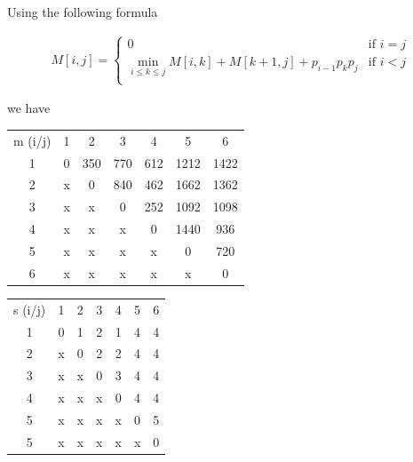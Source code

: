 \documentclass[12pt]{article}
\begin{document}
\begin{enumerate}[1.]
\begin{mdframed}
        \bigskip

        Using the following formula

        \begin{align}
            M[i,j] = \begin{cases}
                0 & \text{if $i = j$}\\
                \min_{i \leq k \leq j} M[i,k] + M[k+1,j] + p_{i-1}p_{k}p_j & \text{if $i < j$}\\
            \end{cases}
        \end{align}

        we have

        \begin{center}
            \begin{tabular}{|c|c|c|c|c|c|c|}
                \hline
                m (i/j) & 1 & 2 & 3 & 4 & 5 & 6\\
                1 & 0 & 350 & 770 & 612 & 1212 & 1422\\
                2 & x & 0 & 840 & 462 & 1662 & 1362\\
                3 & x & x & 0 & 252 & 1092 & 1098\\
                4 & x & x & x & 0 & 1440 & 936\\
                5 & x & x & x & x & 0 & 720\\
                6 & x & x & x & x & x & 0\\
                \hline
            \end{tabular}

            \color{red}
            \begin{tabular}{|c|c|c|c|c|c|c|}
                \hline
                s (i/j) & 1 & 2 & 3 & 4 & 5 & 6\\
                1 & 0 & 1 & 2 & 1 & 4 & 4\\
                2 & x & 0 & 2 & 2 & 4 & 4\\
                3 & x & x & 0 & 3 & 4 & 4\\
                4 & x & x & x & 0 & 4 & 4\\
                5 & x & x & x & x & 0 & 5\\
                5 & x & x & x & x & x & 0\\
                \hline
            \end{tabular}
            \color{black}
        \end{center}

        \bigskip


\end{mdframed}
\end{enumerate}
\end{document}
